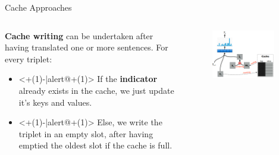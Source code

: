 \begin{frame}{Cache Approaches}
	\begin{columns}[c] %
		\begin{column}{.50\textwidth}
			\textbf{Cache writing} can be undertaken after having translated one or more sentences. For every triplet:
			\begin{itemize}
				\item<+(1)-|alert@+(1)> If the \textbf{indicator} already exists in the cache, we just update it's keys and values.  
				\item<+(1)-|alert@+(1)> Else, we write the triplet in an empty slot, after having emptied the oldest slot if the cache is full.
			\end{itemize} 
		\end{column}%
		\hfill%
		\begin{column}{.50\textwidth}
			\begin{figure}
				\centering
				\includegraphics[width=0.9\textwidth]{Images/cache_only}
				\label{fig:cacheonly}
			\end{figure}
		\end{column}%
	\end{columns} 
\end{frame}

